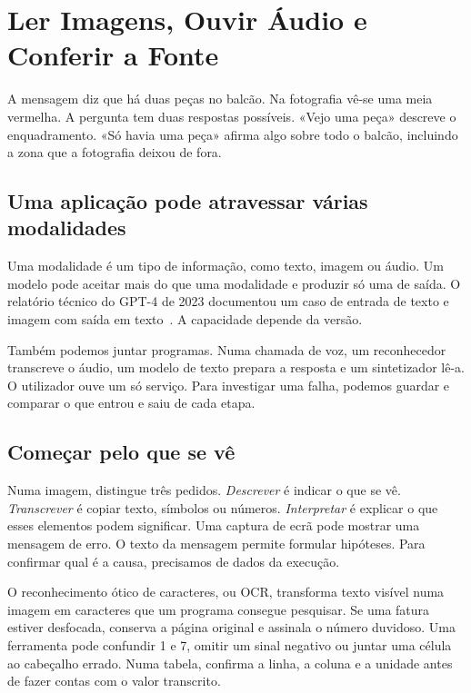 \chapter{Ler Imagens, Ouvir Áudio e Conferir a Fonte}
\label{ch:multimodal}

\ficcao A mensagem diz que há duas peças no balcão. Na fotografia vê-se uma meia vermelha. A pergunta tem duas respostas possíveis. «Vejo uma peça» descreve o enquadramento. «Só havia uma peça» afirma algo sobre todo o balcão, incluindo a zona que a fotografia deixou de fora.

\section{Uma aplicação pode atravessar várias modalidades}

Uma modalidade é um tipo de informação, como texto, imagem ou áudio. Um modelo pode aceitar mais do que uma modalidade e produzir só uma de saída. O relatório técnico do GPT-4 de 2023 documentou um caso de entrada de texto e imagem com saída em texto~\citep{gpt4report2023}. A capacidade depende da versão.

Também podemos juntar programas. Numa chamada de voz, um reconhecedor transcreve o áudio, um modelo de texto prepara a resposta e um sintetizador lê-a. O utilizador ouve um só serviço. Para investigar uma falha, podemos guardar e comparar o que entrou e saiu de cada etapa.

\section{Começar pelo que se vê}

Numa imagem, distingue três pedidos. \emph{Descrever} é indicar o que se vê. \emph{Transcrever} é copiar texto, símbolos ou números. \emph{Interpretar} é explicar o que esses elementos podem significar. Uma captura de ecrã pode mostrar uma mensagem de erro. O texto da mensagem permite formular hipóteses. Para confirmar qual é a causa, precisamos de dados da execução.

O reconhecimento ótico de caracteres, ou OCR, transforma texto visível numa imagem em caracteres que um programa consegue pesquisar. Se uma fatura estiver desfocada, conserva a página original e assinala o número duvidoso. Uma ferramenta pode confundir 1 e 7, omitir um sinal negativo ou juntar uma célula ao cabeçalho errado. Numa tabela, confirma a linha, a coluna e a unidade antes de fazer contas com o valor transcrito.

